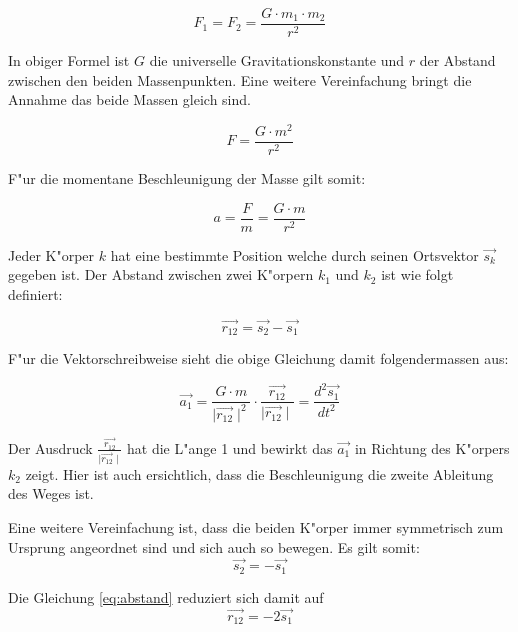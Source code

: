 \begin{refsection}
\begin{equation} \label{eq:newton}
F_1 = F_2=\frac{G \cdot m_1 \cdot m_2}{r^2}
\end{equation}


In obiger Formel ist $G$ die universelle Gravitationskonstante und $r$ der Abstand zwischen den beiden Massenpunkten.
Eine weitere Vereinfachung bringt die Annahme das beide Massen gleich sind.

\begin{equation}
F=\frac{G \cdot m^2}{r^2}
\end{equation}

F"ur die momentane Beschleunigung der Masse gilt somit:

\begin{equation}
a=\frac{F}{m}=\frac{G \cdot m}{r^2}
\end{equation}

Jeder K"orper $k$ hat eine bestimmte Position welche durch seinen Ortsvektor $\vec{s_k}$ gegeben ist.
Der Abstand zwischen zwei K"orpern $k_1$ und $k_2$ ist wie folgt definiert:

\begin{equation} \label{eq:abstand}
\vec{r_{12}}= \vec{s_2}-\vec{s_1}
\end{equation}

F"ur die Vektorschreibweise sieht die obige Gleichung damit folgendermassen aus:

\begin{equation} \label{eq:gravitationVektor}
\vec{a_1} =\frac{G \cdot m}{\mid \vec{r_{12}}\mid ^2}\cdot \frac{\vec{r_{12}}}{\mid \vec{r_{12}}\mid}=  \frac{d^2 \vec{s_1}}{dt^2}
\end{equation}

Der Ausdruck $\frac{\vec{r_{12}}}{\mid \vec{r_{12}}\mid}$ hat die L"ange 1 und bewirkt das $\vec{a_1}$ in Richtung des K"orpers $k_2$ zeigt.
Hier ist auch ersichtlich, dass die Beschleunigung die zweite Ableitung des Weges ist.
  
Eine weitere Vereinfachung ist, dass die beiden K"orper immer symmetrisch zum Ursprung angeordnet sind und sich auch so bewegen.
Es gilt somit:
\begin{equation}
\vec{s_2}=-\vec{s_1}
\end{equation}

Die Gleichung \ref{eq:abstand} reduziert sich damit auf
\begin{equation}
\vec{r_{12}}= -2\vec{s_1}
\end{equation}


\end{refsection}
